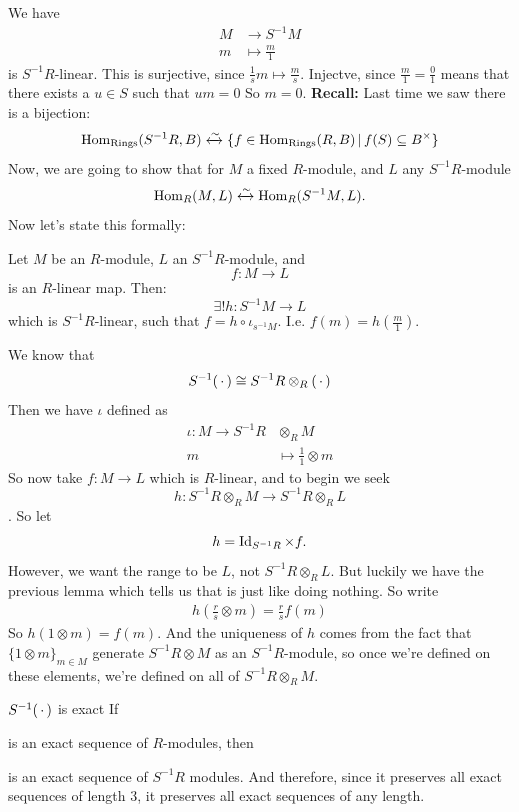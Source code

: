 \documentclass{article}
\begin{document}
\proof We have \begin{align*}
    M &\to S^{-1}M\\
    m &\mapsto \frac{m}{1}
\end{align*}
is $S^{-1}R$-linear. This is surjective, since $\frac{1}{s}m \mapsto \frac{m}{s}$. Injectve, since $\frac{m}{1} = \frac{0}{1}$ means that there exists a $u \in S$ such that $um=0$ So $m=0$. \endproof
\textbf{Recall: }Last time we saw there is a bijection: \[ \operatorname{Hom}_{\text{Rings}}(S^{-1}R,B) \xleftrightarrow{\sim} \{f \in \operatorname{Hom}_{\text{Rings}}(R,B) \, | \, f(S) \subseteq B^{\times} \} \] 
Now, we are going to show that for $M$ a fixed $R$-module, and $L$ any $S^{-1}R$-module \[ \operatorname{Hom}_{R}(M,L) \xleftrightarrow{\sim} \operatorname{Hom}_{R}(S^{-1}M,L).\] Now let's state this formally:
\begin{fancyprop}{}
    Let $M$ be an $R$-module, $L$ an $S^{-1}R$-module, and \[ f: M \to L \] is an $R$-linear map. Then: \[ \exists! h : S^{-1}M \to L\] which is $S^{-1}R$-linear, such that $f = h \circ \iota_{s^{-1}M}$. I.e. $f(m)=h(\frac{m}{1})$.
\end{fancyprop}
\proof We know that \[ S^{-1}(\, \cdot \,) \cong S^{-1}R \otimes_{R} (\, \cdot \,)\] Then we have $\iota$ defined as 
\begin{align*}
    \iota : M \to S^{-1}R &\otimes_{R} M\\    
    m &\mapsto \frac{1}{1} \otimes m
\end{align*}
So now take $f: M \to L$ which is $R$-linear, and to begin we seek \[h: S^{-1}R \otimes_{R} M \to S^{-1}R \otimes_{R} L\]. So let \[ h= \operatorname{Id}_{S^{-1}R} \times f.\] However, we want the range to be $L$, not $S^{-1}R \otimes_{R} L$. But luckily we have the previous lemma which tells us that  is just like doing nothing. So write \begin{align*}
    h\left(\frac{r}{s} \otimes m\right) = \frac{r}{s} f(m)
\end{align*}
So $h(1\otimes m) = f(m)$. And the uniqueness of $h$ comes from the fact that $\{ 1\otimes m\}_{m \in M}$ generate $S^{-1}R \otimes M$ as an $S^{-1}R$-module, so once we're defined on these elements, we're defined on all of $S^{-1}R \otimes_{R} M$. \endproof
\begin{fancythm}{$S^{-1}(\, \cdot \,)$ is exact}
    If \begin{center}
    \end{center}
    is an exact sequence of $R$-modules, then \begin{center}
    \end{center}
    is an exact sequence of $S^{-1}R$ modules. And therefore, since it preserves all exact sequences of length $3$, it preserves all exact sequences of any length.
\end{fancythm}
\end{document}
